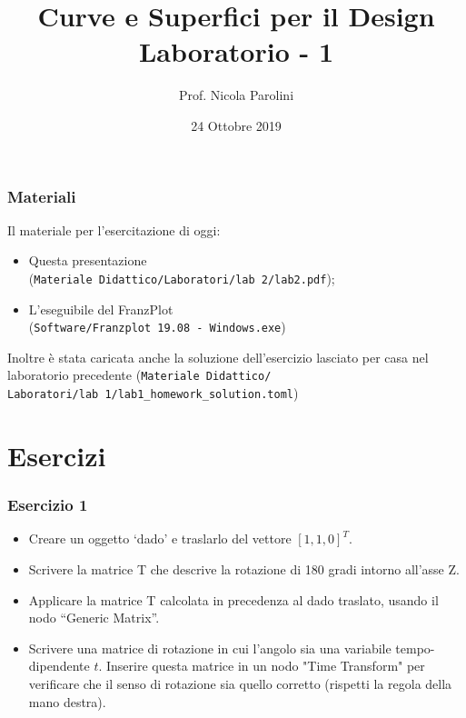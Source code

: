 \documentclass{beamer}
\title[Curve e Sup. - Lab 1]{Curve e Superfici per il Design \\ Laboratorio - 1}
\author[Prof. Parolini]{Prof. Nicola Parolini}
\date{24 Ottobre 2019}
\newcommand{\frnzplt}{FranzPlot }
\begin{document}
\begin{frame}
\maketitle
\end{frame}

\begin{frame}
\frametitle{Materiali}
Il materiale per l'esercitazione di oggi:
\begin{itemize}
\item Questa presentazione \\ (\texttt{Materiale Didattico/Laboratori/lab 2/lab2.pdf});
\item L'eseguibile del \frnzplt \\ (\texttt{Software/Franzplot 19.08 - Windows.exe})
\end{itemize}
Inoltre \`e stata caricata anche la soluzione dell'esercizio lasciato per casa nel laboratorio precedente
    (\texttt{Materiale Didattico/ \\ Laboratori/lab 1/lab1\_homework\_solution.toml})
\end{frame}



\section{Esercizi}
%
\begin{frame}
\frametitle{Esercizio 1}
\begin{itemize}
    \item Creare un oggetto `dado' e traslarlo del vettore $[1, 1, 0]^T$.
    \item Scrivere la matrice T che descrive la rotazione di 180 gradi intorno all'asse Z.
    \item Applicare la matrice T calcolata in precedenza al dado traslato, usando il nodo
        ``Generic Matrix''.
    \item Scrivere una matrice di rotazione in cui l'angolo sia una variabile tempo-dipendente $t$. Inserire questa matrice in un nodo "Time Transform"
        per verificare che il senso di rotazione sia quello corretto (rispetti la regola della mano destra).
\end{itemize}
\end{frame}
\end{document}
